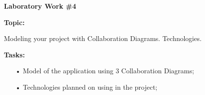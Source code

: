\graphicspath{ {pic/} }
\begin{flushleft}
\setlength{\parindent}{2ex}\par
\textbf{Laboratory Work \#4} \par
\textbf{Topic:}\par
Modeling your project with Collaboration Diagrams. Technologies.\par
\textbf{Tasks:}
\begin{enumerate}
\item[•] Model of the application using 3 Collaboration Diagrams;
\item[•] Technologies planned on using in the project;
\end{enumerate}
\end{flushleft}
\clearpage
